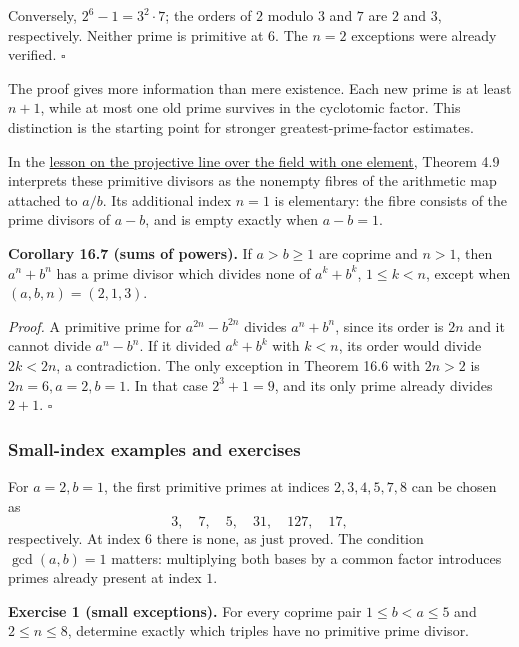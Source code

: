 \documentclass[
  11pt,
  a4paper,
]{article}
\begin{document}
Conversely, \(2^6-1=3^2\cdot7\); the orders of \(2\) modulo \(3\) and
\(7\) are \(2\) and \(3\), respectively. Neither prime is primitive at
\(6\). The \(n=2\) exceptions were already verified. \(\square\)

The proof gives more information than mere existence. Each new prime is
at least \(n+1\), while at most one old prime survives in the cyclotomic
factor. This distinction is the starting point for stronger
greatest-prime-factor estimates.

In the
\href{https://kokunoyumeto.github.io/open-math-courses-public/courses/the-field-with-one-element/the-projective-line-over-f-1-and-the-abc-conjecture.html\#section-4.5}{lesson
on the projective line over the field with one element}, Theorem 4.9
interprets these primitive divisors as the nonempty fibres of the
arithmetic map attached to \(a/b\). Its additional index \(n=1\) is
elementary: the fibre consists of the prime divisors of \(a-b\), and is
empty exactly when \(a-b=1\).

\textbf{Corollary 16.7 (sums of powers).} If \(a>b\geq1\) are coprime
and \(n>1\), then \(a^n+b^n\) has a prime divisor which divides none of
\(a^k+b^k\), \(1\leq k<n\), except when \((a,b,n)=(2,1,3)\).

\emph{Proof.} A primitive prime for \(a^{2n}-b^{2n}\) divides
\(a^n+b^n\), since its order is \(2n\) and it cannot divide \(a^n-b^n\).
If it divided \(a^k+b^k\) with \(k<n\), its order would divide
\(2k<2n\), a contradiction. The only exception in Theorem 16.6 with
\(2n>2\) is \(2n=6,a=2,b=1\). In that case \(2^3+1=9\), and its only
prime already divides \(2+1\). \(\square\)

\subsubsection{Small-index examples and
exercises}\label{small-index-examples-and-exercises}

For \(a=2,b=1\), the first primitive primes at indices \(2,3,4,5,7,8\)
can be chosen as \[
 3,\quad7,\quad5,\quad31,\quad127,\quad17,
 \tag{16.26}
\] respectively. At index \(6\) there is none, as just proved. The
condition \(\gcd(a,b)=1\) matters: multiplying both bases by a common
factor introduces primes already present at index \(1\).

\textbf{Exercise 1 (small exceptions).} For every coprime pair
\(1\leq b<a\leq5\) and \(2\leq n\leq8\), determine exactly which triples
have no primitive prime divisor.
\end{document}
